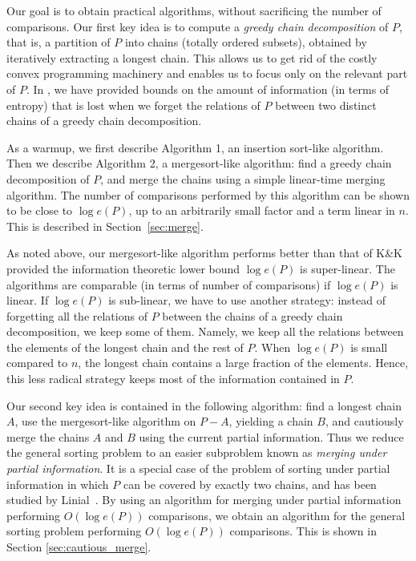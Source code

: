 \documentclass{article} \usepackage{fullpage}
\begin{document}
Our goal is to obtain practical algorithms, without sacrificing the number of comparisons. Our first key idea is to compute a {\sl greedy chain decomposition\/} of $P$, that is, a partition of $P$ into chains (totally ordered subsets), obtained by iteratively extracting a longest chain. This allows us to get rid of the costly convex programming machinery and enables us to focus only on the relevant part of $P$. In \cite{POP_SICOMP}, we have provided bounds on the amount of information (in terms of entropy) that is lost when we forget the relations of $P$ between two distinct chains of a greedy chain decomposition.

As a warmup, we first describe Algorithm 1, an insertion sort-like algorithm. Then we describe Algorithm 2, a mergesort-like algorithm: find a greedy chain decomposition of $P$, and merge the chains using a simple linear-time merging algorithm. The number of comparisons performed by this algorithm can be shown to be close to $\log e(P)$, up to an arbitrarily small factor and a term linear in $n$. This is described in Section~\ref{sec:merge}.

As noted above, our mergesort-like algorithm performs better than that of K\&K provided the information theoretic lower bound $\log e(P)$ is super-linear. The algorithms are comparable (in terms of number of comparisons) if $\log e(P)$ is linear. If $\log e(P)$ is sub-linear, we have to use another strategy: instead of forgetting all the relations of $P$ between the chains of a greedy chain decomposition, we keep some of them. Namely, we keep all the relations between the elements of the longest chain and the rest of $P$. When $\log e(P)$ is small compared to $n$, the longest chain contains a large fraction of the elements. Hence, this less radical strategy keeps most of the information contained in $P$.

Our second key idea is contained in the following algorithm: find a longest chain $A$, use the mergesort-like algorithm on $P-A$, yielding a chain $B$, and cautiously merge the chains $A$ and $B$ using the current partial information. Thus we reduce the general sorting problem to an easier subproblem known as {\sl merging under partial information}. It is a special case of the problem of sorting under partial information in which $P$ can be covered by exactly two chains, and has been studied by Linial~\cite{L84}. By using an algorithm for merging under partial information performing $O(\log e(P))$ comparisons, we obtain an algorithm for the general sorting problem performing $O(\log e(P))$ comparisons. This is shown in Section \ref{sec:cautious_merge}.
\end{document}
